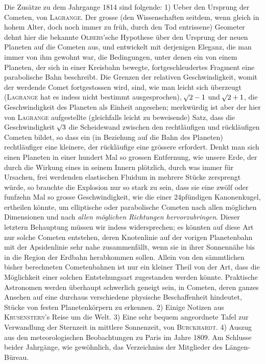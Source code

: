 Die Zusätze zu dem Jahrgange 1814 sind folgende: 1) Ueber den Ursprung der Cometen, von \textsc{Lagrange}. Der grosse (den Wissenschaften seitdem, wenn gleich in hohem Alter, doch noch immer zu früh, durch den Tod entrissene) Geometer dehnt hier die bekannte \textsc{Olbers}'sche Hypothese über den Ursprung der neuen Planeten auf die Cometen aus, und entwickelt mit derjenigen Eleganz, die man immer von ihm gewohnt war, die Bedingungen, unter denen ein von einem Planeten, der sich in einer Kreisbahn bewegte, fortgeschleudertes Fragment eine parabolische Bahn beschreibt. Die Grenzen der relativen Geschwindigkeit, womit der werdende Comet fortgestossen wird, sind, wie man leicht sich überzeugt (\textsc{Lagrange} hat es indess nicht bestimmt ausgesprochen), $\mathord{{}^{}\!\surd}2-1$ und $\mathord{{}^{}\!\surd}2+1$, die Geschwindigkeit des Planeten als Einheit angesehen; merkwürdig ist aber der hier von \textsc{Lagrange} aufgestellte (gleichfalls leicht zu beweisende) Satz, dass die Geschwindigkeit $\mathord{{}^{}\!\surd}3$ die Scheidewand zwischen den rechtläufigen und rückläufigen Cometen bildet, so dass ein (in Beziehung auf die Bahn des Planeten) rechtläufiger eine kleinere, der rückläufige eine grössere erfordert. Denkt man sich einen Planeten in einer hundert Mal so grossen Entfernung, wie unsere Erde, der durch die Wirkung eines in seinem Innern plötzlich, durch was immer für Ursachen, frei werdenden elastischen Fluidum in mehrere Stücke zersprengt würde, so brauchte die Explosion nur so stark zu sein, dass sie eine zwölf oder funfzehn Mal so grosse Geschwindigkeit, wie die einer 24pfündigen Kanonenkugel, ertheilen könnte, um elliptische oder parabolische Cometen nach allen möglichen Dimensionen und nach \emph{allen möglichen Richtungen hervorzubringen}. Dieser letztern Behauptung müssen wir indess widersprechen; es könnten auf diese Art nur solche Cometen entstehen, deren Knotenlinie auf der vorigen Planetenbahn mit der Apsidenlinie sehr nahe zusammenfällt, wenn sie in ihrer Sonnennähe bis in die Region der Erdbahn herabkommen sollen. Allein von den sämmtlichen bisher berechneten Cometenbahnen ist nur ein kleiner Theil von der Art, dass die Möglichkeit einer solchen Entstehungsart zugestanden werden könnte. Praktische Astronomen werden überhaupt schwerlich geneigt sein, in Cometen, deren ganzes Ansehen auf eine durchaus verschiedene physische Beschaffenheit hindeutet, Stücke von festen Planetenkörpern zu erkennen. 2) Einige Notizen aus \textsc{Krusenstern}'s Reise um die Welt. 3) Eine sehr bequem angeordnete Tafel zur Verwandlung der Sternzeit in mittlere Sonnenzeit, von \textsc{Burckhardt}. 4) Auszug aus den meteorologischen Beobachtungen zu Paris im Jahre 1809. Am Schlusse beider Jahrgänge, wie gewöhnlich, das Verzeichniss der Mitglieder des Längen-Büreau.
